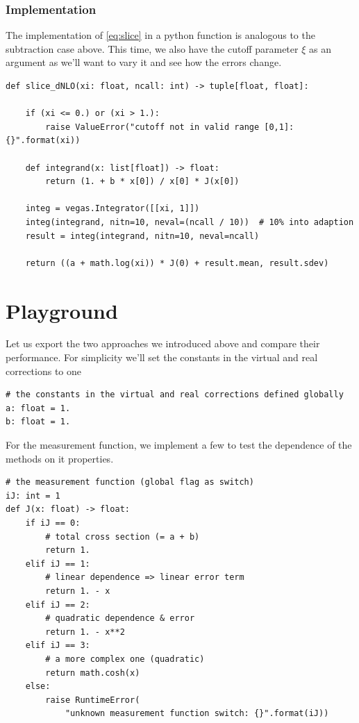 \documentclass[11pt]{article}
\begin{document}
\subsubsection{Implementation}
\label{sec:orga0d7e4c}
The implementation of \eqref{eq:slice} in a python function is analogous to the subtraction case above.
This time, we also have the cutoff parameter \(\xi\) as an argument as we'll want to vary it and see how the errors change.
\begin{verbatim}
def slice_dNLO(xi: float, ncall: int) -> tuple[float, float]:

    if (xi <= 0.) or (xi > 1.):
        raise ValueError("cutoff not in valid range [0,1]: {}".format(xi))

    def integrand(x: list[float]) -> float:
        return (1. + b * x[0]) / x[0] * J(x[0])

    integ = vegas.Integrator([[xi, 1]])
    integ(integrand, nitn=10, neval=(ncall / 10))  # 10% into adaption
    result = integ(integrand, nitn=10, neval=ncall)

    return ((a + math.log(xi)) * J(0) + result.mean, result.sdev)
\end{verbatim}



\section{Playground}
\label{sec:orgf95514a}
Let us export the two approaches we introduced above and compare their performance.
For simplicity we'll set the constants in the virtual and real corrections to one
\begin{verbatim}
# the constants in the virtual and real corrections defined globally
a: float = 1.
b: float = 1.
\end{verbatim}
For the measurement function, we implement a few to test the dependence of the methods on it properties.
\begin{verbatim}
# the measurement function (global flag as switch)
iJ: int = 1
def J(x: float) -> float:
    if iJ == 0:
        # total cross section (= a + b)
        return 1.
    elif iJ == 1:
        # linear dependence => linear error term
        return 1. - x
    elif iJ == 2:
        # quadratic dependence & error
        return 1. - x**2
    elif iJ == 3:
        # a more complex one (quadratic)
        return math.cosh(x)
    else:
        raise RuntimeError(
            "unknown measurement function switch: {}".format(iJ))
\end{verbatim}
\end{document}
